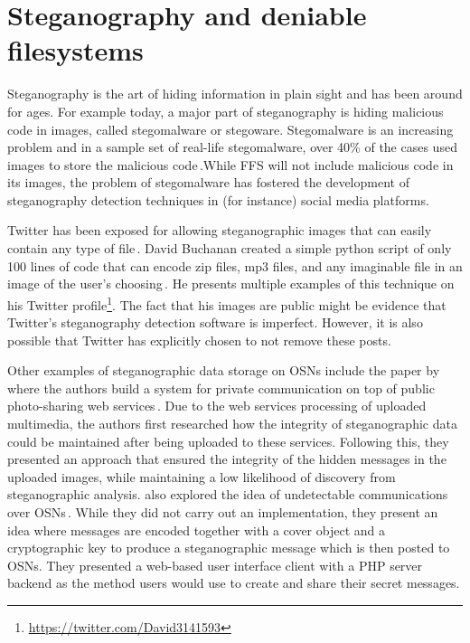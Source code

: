 \section{Steganography and deniable filesystems}
\label{sec:SteganographyAndDeniableFS}
Steganography is the art of hiding information in plain sight and has been around for ages. For example today, a major part of steganography is hiding malicious code in images, called stegomalware or stegoware. Stegomalware is an increasing problem and in a sample set of \mbox{real-life} stegomalware, over 40\% of the cases used images to store the malicious code\,\cite{stichtingcuingfoundationSIMARGLStegwarePrimer2020}.While \gls{FFS} will not include malicious code in its images, the problem of stegomalware  has fostered the development of steganography detection techniques in (for instance) social media platforms. 

Twitter has been exposed for allowing steganographic images that can easily contain any type of file\,\cite{TwitterImagesCan}. David Buchanan created a simple python script of only \num{100} lines of code that can encode zip files, mp3 files, and any imaginable file in an image of the user's choosing\,\cite{buchananTweetablepolyglotpng2022}. He presents multiple examples of this technique on his Twitter profile\footnote{\url{https://twitter.com/David3141593}}. The fact that his images are public might be evidence that Twitter's steganography detection software is imperfect. However, it is also possible that Twitter has explicitly chosen to not remove these posts.

Other examples of steganographic data storage on \glspl{OSN} include the paper by \citeauthor{ningSecretMessageSharing2014} where the authors build a system for private communication on top of public \mbox{photo-sharing} web services\,\cite{ningSecretMessageSharing2014}. Due to the web services processing of uploaded multimedia, the authors first researched how the integrity of steganographic data could be maintained after being uploaded to these services. Following this, they presented an approach that ensured the integrity of the hidden messages in the uploaded images, while maintaining a low likelihood of discovery from steganographic analysis. \citeauthor{beatoUndetectableCommunicationOnline2014} also explored the idea of undetectable communications over \glspl{OSN}\,\cite{beatoUndetectableCommunicationOnline2014}. While they did not carry out an implementation, they present an idea where messages are encoded together with a cover object and a cryptographic key to produce a steganographic message which is then posted to \glspl{OSN}. They presented a \mbox{web-based} user interface client with a \gls{PHP} server backend as the method users would use to create and share their secret messages.

